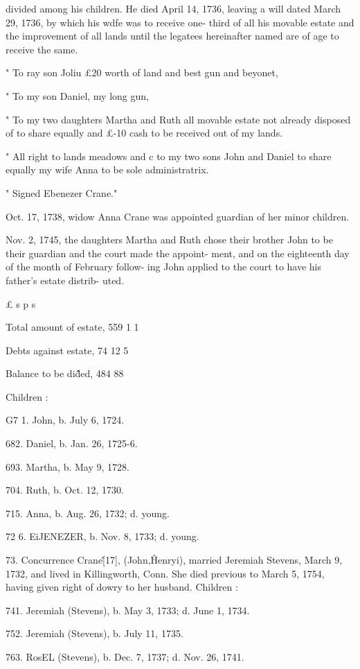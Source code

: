 \documentclass{book}
\begin{document}
divided among his children. He died April 14, 1736, leaving a 
will dated March 29, 1736, by which his wdfe was to receive one- 
third of all his movable estate and the improvement of all lands 
until the legatees hereinafter named are of age to receive the same. 

" To ray son Joliu £20 worth of land and best gun and beyonet, 

" To my son Daniel, my long gun, 

" To my two daughters Martha and Ruth all movable estate not already 
disposed of to share equally and £-10 cash to be received out of my lands. 

" All right to lands meadows and c to my two sons John and Daniel 
to share equally my wife Anna to be sole administratrix. 

" Signed Ebenezer Crane." 

Oct. 17, 1738, widow Anna Crane was appointed guardian of 
her minor children. 

Nov. 2, 1745, the daughters Martha and Ruth chose their 
brother John to be their guardian and the court made the appoint- 
ment, and on the eighteenth day of the month of February follow- 
ing John applied to the court to have his father's estate distrib- 
uted. 

£ s p s 

Total amount of estate, 559  1  1 

Debts against estate, 74  12  5 

Balance to be di\^\^ded, 484 88 

Children : 

G7 1. John, b. July 6, 1724. 

682. Daniel, b. Jan. 26, 1725-6. 

693. Martha, b. May 9, 1728. 

704. Ruth, b. Oct. 12, 1730. 

715. Anna, b. Aug. 26, 1732; d. young. 

72  6. EiJENEZER, b. Nov. 8, 1733; d. young. 

73. Concurrence Crane\^ [17], (John,\^ Henryi), married 
Jeremiah Stevens, March 9, 1732, and lived in Killingworth, 
Conn. She died previous to March 5, 1754, having given right 
of dowry to her husband. Children : 

741. Jeremiah (Stevens), b. May 3, 1733; d. June 1, 1734. 

752. Jeremiah (Stevens), b. July 11, 1735. 

763. RosEL (Stevens), b. Dec. 7, 1737; d. Nov. 26, 1741. 
\end{document}
